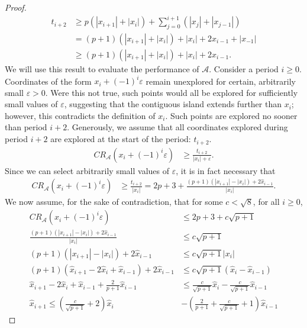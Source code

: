\begin{proof}
  \begin{align*}
    t_{i+2} &\geq p\left(|x_{i+1}|+|x_i|\right) + \sum_{j=0}^{i+1}\left(|x_j|+|x_{j-1}|\right) \\
    &= (p+1)\left(|x_{i+1}|+|x_i|\right) + |x_i| + 2\hat{x}_{i-1} + |x_{-1}| \\
    &\geq (p+1)\left(|x_{i+1}|+|x_i|\right) + |x_i| + 2\hat{x}_{i-1} .
  \end{align*}
  We will use this result to evaluate the performance of $\mathcal{A}$. Consider a period $i\geq 0$. Coordinates of the form $x_i + (-1)^i\varepsilon$ remain unexplored for certain, arbitrarily small $\varepsilon>0$. Were this not true, such points would all be explored for sufficiently small values of $\varepsilon$, suggesting that the contiguous island extends further than $x_i$; however, this contradicts the definition of $x_i$. Such points are explored no sooner than period $i+2$. Generously, we assume that all coordinates explored during period $i+2$ are explored at the start of the period: $t_{i+2}$. 
  \begin{align*}
    CR_{\mathcal{A}}\left(x_i + (-1)^i\varepsilon\right) &\geq \frac{t_{i+2}}{|x_i|+\varepsilon} .
  \end{align*}
  Since we can select arbitrarily small values of $\varepsilon$, it is in fact necessary that
  \begin{align*}
    CR_{\mathcal{A}}\left(x_i + (-1)^i\varepsilon\right) &\geq \frac{t_{i+2}}{|x_i|} = 2p + 3 +\frac{(p+1)\left(|x_{i+1}|-|x_i|\right) + 2\hat{x}_{i-1}}{|x_i|} .
  \end{align*}
  We now assume, for the sake of contradiction, that for some $c<\sqrt8$, for all $i\geq 0$, 
  \begin{align*}
    CR_{\mathcal{A}}\left(x_i + (-1)^i\varepsilon\right) &\leq 2p + 3 + c\sqrt{p+1} \\
    \frac{(p+1)\left(|x_{i+1}|-|x_i|\right) + 2\hat{x}_{i-1}}{|x_i|} &\leq c\sqrt{p+1} \\
    (p+1)\left(|x_{i+1}|-|x_i|\right) + 2\hat{x}_{i-1} &\leq c\sqrt{p+1}|x_i| \\
    (p+1)\left(\hat{x}_{i+1}-2\hat{x}_i+\hat{x}_{i-1}\right) + 2\hat{x}_{i-1} &\leq c\sqrt{p+1}\left(\hat{x}_i-\hat{x}_{i-1}\right) \\
    \hat{x}_{i+1}-2\hat{x}_i+\hat{x}_{i-1} + \frac{2}{p+1}\hat{x}_{i-1} &\leq \frac{c}{\sqrt{p+1}}\hat{x}_i-\frac{c}{\sqrt{p+1}}\hat{x}_{i-1} \\
    \hat{x}_{i+1} \leq \left(\frac{c}{\sqrt{p+1}}+2\right)\hat{x}_i &- \left(\frac{2}{p+1}+\frac{c}{\sqrt{p+1}}+1\right)\hat{x}_{i-1}

\end{align*}
\end{proof}
